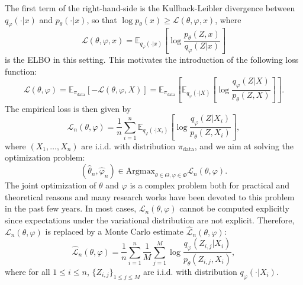 \documentclass[english,graybox,envcountchap,envcountsame,sectrefs,shortlabels]{svmono}
\theoremstyle{style}
\newcommand{\eqsp}{}
\begin{document}
The first term of the right-hand-side is the Kullback-Leibler divergence between $q_{\varphi}(\cdot|x)$ and $p_\theta(\cdot|x)$, so that $\log p_\theta(x)\geq \mathcal{L}(\theta,\varphi,x)$, where
$$
\mathcal{L}(\theta,\varphi,x) = \mathbb{E}_{q_{\varphi}(\cdot|x)}\left[\log \frac{p_\theta(Z,x)}{q_{\varphi}(Z|x)}\right]
$$
is the ELBO in this setting. 
This motivates the introduction of the following loss function:
$$
\mathcal{L}(\theta,\varphi) = \mathbb{E}_{\pi_{\mathrm{data}}}[-\mathcal{L}(\theta,\varphi,X)] = \mathbb{E}_{\pi_{\mathrm{data}}}\left[\mathbb{E}_{q_{\varphi}(\cdot|X)}\left[\log \frac{q_{\varphi}(Z|X)}{p_\theta(Z,X)}\right]\right]\eqsp.
$$
The empirical loss is then given by
$$
\mathcal{L}_n(\theta,\varphi) = \frac{1}{n}\sum_{i=1}^n\mathbb{E}_{q_{\varphi}(\cdot|X_i)}\left[\log \frac{q_{\varphi}(Z|X_i)}{p_\theta(Z,X_i)}\right]\eqsp,
$$
where $(X_1,\ldots,X_n)$ are i.i.d. with distribution $\pi_{\mathrm{data}}$, and we aim at solving the optimization problem:
\begin{equation}
\label{eq:optim:ELBO}
(\widehat \theta_n,\widehat \varphi_n) \in \mathrm{Argmax}_{\theta\in\Theta,\varphi\in\Phi}\eqsp \mathcal{L}_n(\theta,\varphi) \eqsp.
\end{equation}
The joint optimization of $\theta$ and $\varphi$ is a complex problem both for practical and theoretical reasons and many research works have been devoted to this problem in the past few years. In most cases, $\mathcal{L}_n(\theta,\varphi)$ cannot be computed explicitly since expectations under the variational distribution are not explicit. Therefore, $\mathcal{L}_n(\theta,\varphi) $ is replaced by a Monte Carlo estimate $\widehat{\mathcal{L}}_n(\theta,\varphi)$:
$$
\widehat{\mathcal{L}}_n(\theta,\varphi) =  \frac{1}{n}\sum_{i=1}^n\frac{1}{M}\sum_{j=1}^M\log \frac{q_{\varphi}(Z_{i,j}|X_i)}{p_\theta(Z_{i,j},X_i)}\eqsp,
$$ 
where for all $1\leqslant i \leqslant n$, $\{Z_{i,j}\}_{1\leqslant j\leqslant M}$ are i.i.d. with distribution $q_{\varphi}(\cdot|X_i)$.
\end{document}
